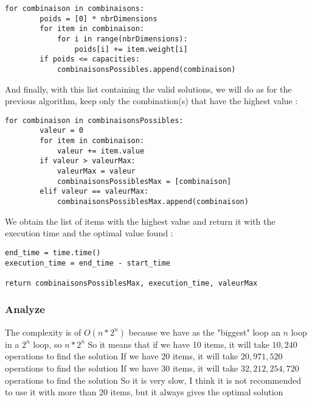 \documentclass[12pt]{article}
\begin{document}
            \bigskip
            \begin{lstlisting}
for combinaison in combinaisons:
        poids = [0] * nbrDimensions
        for item in combinaison:
            for i in range(nbrDimensions):
                poids[i] += item.weight[i]
        if poids <= capacities:
            combinaisonsPossibles.append(combinaison)
            \end{lstlisting}
            \bigskip

            And finally, with this list containing the valid solutions, we will do as for the previous algorithm, keep only the combination(s) that have the highest value : 

            \bigskip
            \begin{lstlisting}
for combinaison in combinaisonsPossibles:
        valeur = 0
        for item in combinaison:
            valeur += item.value
        if valeur > valeurMax:
            valeurMax = valeur
            combinaisonsPossiblesMax = [combinaison]
        elif valeur == valeurMax:
            combinaisonsPossiblesMax.append(combinaison)
            \end{lstlisting}
            \bigskip

            We obtain the list of items with the highest value and return it with the execution time and the optimal value found :

            \bigskip
            \begin{lstlisting}
end_time = time.time()
execution_time = end_time - start_time

return combinaisonsPossiblesMax, execution_time, valeurMax
            \end{lstlisting}
            \bigskip

        \subsubsection{Analyze}

            The complexity is of $O(n*2^n)$ because we have as the "biggest" loop an $n$ loop in a $2^n$ loop, so $n*2^n$\newline\newline
            So it means that if we have 10 items, it will take $10,240$ operations to find the solution\newline
            If we have 20 items, it will take $20,971,520$ operations to find the solution\newline
            If we have 30 items, it will take $32,212,254,720$ operations to find the solution\newline
            So it is very slow, I think it is not recommended to use it with more than 20 items, but it always gives the optimal solution
\end{document}
